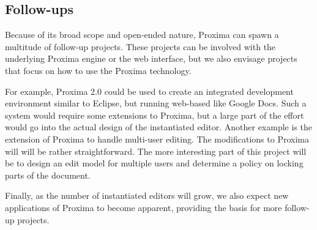 \documentclass[10pt]{article}
\begin{document}
\subsection{Follow-ups}
%
% 
Because of its broad scope and open-ended nature, Proxima can spawn a multitude of follow-up projects. These projects can be involved with the underlying Proxima engine or the web interface, but we also envisage projects that focus on how to use the Proxima technology.

For example, Proxima 2.0 could be used to create an integrated development environment similar to Eclipse, but running web-based like Google Docs. Such a system would require some extensions to Proxima, but a large part of the effort would go into the actual design of the instantiated editor. Another example is the extension of Proxima to handle multi-user editing. The modifications to Proxima will will be rather straightforward. The more interesting part of this project will be to design an edit model for multiple users and determine a policy on locking parts of the document.

Finally, as the number of instantiated editors will grow, we also expect new applications of Proxima to become apparent, providing the basis for more follow-up projects.
\end{document}
